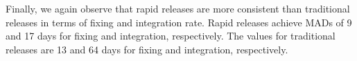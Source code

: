 Finally, we again observe that rapid releases are more consistent than
traditional releases in terms of fixing and integration rate. Rapid releases
achieve MADs of 9 and 17 days for fixing and integration, respectively. The
values for traditional releases are 13 and 64 days for fixing and integration,
respectively.\\ 


